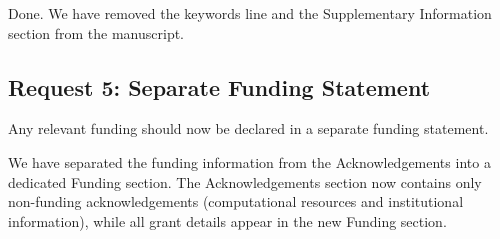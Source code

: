 \documentclass[11pt]{article}
\begin{document}
\begin{responseboxnew}
Done. We have removed the keywords line and the Supplementary Information section from the manuscript.
\end{responseboxnew}

\subsection*{Request 5: Separate Funding Statement}

\begin{editorrequest}
Any relevant funding should now be declared in a separate funding statement.
\end{editorrequest}

\begin{responseboxnew}
We have separated the funding information from the Acknowledgements into a dedicated Funding section. The Acknowledgements section now contains only non-funding acknowledgements (computational resources and institutional information), while all grant details appear in the new Funding section.
\end{responseboxnew}
\end{document}
